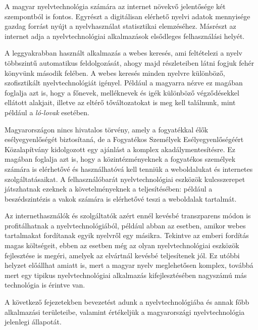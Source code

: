 \begin{multicols}{2}
A magyar nyelvtechnológia számára az internet növekvő jelentősége két szempontból is fontos. Egyrészt a digitálisan elérhető nyelvi adatok mennyisége gazdag forrást nyújt a nyelvhasználat statisztikai elemzéséhez. Másrészt az internet adja a nyelvtechnológiai alkalmazások elsődleges felhasználási helyét. 

A leggyakrabban használt alkalmazás a webes keresés, ami feltételezi a nyelv többszintű automatikus feldolgozását, a\-hogy majd részleteiben látni fogjuk fehér könyvünk második felében. A webes keresés minden nyelvre különböző, szo\-fisz\-ti\-kált nyelvtechnológiát igényel. Például a magyarra nézve ez magában foglalja azt is, hogy a főnevek, melléknevek és igék különböző végződésekkel ellátott alakjait, illetve az eltérő tőváltozatokat is meg kell találnunk, mint például a \textit{ló-lovak} ese\-té\-ben.  

Magyarországon nincs hivatalos törvény, amely a fogyatékkal élők esélyegyenlőségét biztosítaná, de a Fogyatékos Személyek Esélyegyenlőségéért Közalapítvány kidolgozott egy ajánlást a komplex akadálymentesítésre. Ez magában foglalja azt is, hogy a közintézményeknek a fo\-gya\-té\-kos személyek számára is elérhetővé és használhatóvá kell tenniük a weboldalukat és internetes szolgáltatásaikat. A felhasználóbarát nyelvtechnológiai eszközök kulcsszerepet játszhatnak ezeknek a kö\-ve\-tel\-mé\-nyek\-nek a teljesítésében: például a beszédszintézis a vakok számára is elérhetővé teszi a weboldalak tartalmát.   

Az internethasználók és szolgáltatók azért ennél kevésbé transzparens módon is pro\-fi\-tál\-hat\-nak a nyelvtechnológiából, például abban az esetben, amikor webes tartalmakat fordítanak egyik nyelvről egy másikra. Tekintve az emberi fordítás magas költségeit, ebben az esetben még az olyan nyelvtechnológiai eszközök fej\-lesz\-té\-se is megéri, amelyek az elvártnál kevésbé teljesítenek jól. Ez utóbbi helyzet előállhat amiatt is, mert a magyar nyelv meglehetősen komplex, továbbá mert egy tipikus nyelvtechnológiai alkalmazás ki\-fej\-lesz\-té\-sé\-ben nagyszámú más technológia is érintve van.

A következő fejezetekben bevezetést adunk a nyelvtechnológiába és annak főbb al\-kal\-ma\-zá\-si területeibe, valamint értékeljük a magyarországi nyelvtechnológia jelenlegi állapotát.

\end{multicols}

\clearpage


